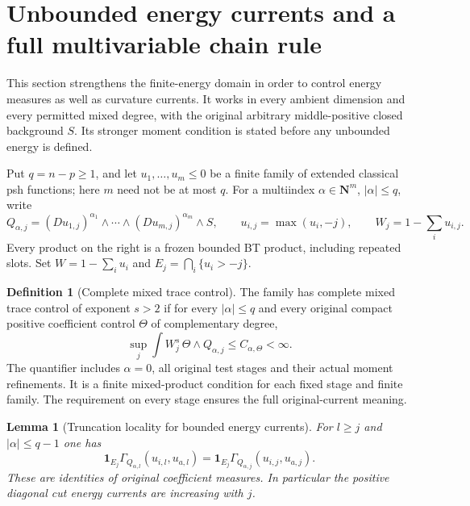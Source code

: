 \documentclass[11pt,a4paper]{article}
\numberwithin{equation}{section}
\newtheorem{lemma}[theorem]{Lemma}
\theoremstyle{definition}
\newtheorem{definition}[theorem]{Definition}
\theoremstyle{remark}
\begin{document}
\section{Unbounded energy currents and a full multivariable chain rule}
\label{sec:r11-unbounded-energy-chain}

This section strengthens the finite-energy domain in order to control
energy measures as well as curvature currents.  It works in every
ambient dimension and every permitted mixed degree, with the original
arbitrary middle-positive closed background $S$.  Its stronger moment
condition is stated before any unbounded energy is defined.

Put $q=n-p\geq1$, and let $u_1,\ldots,u_m\leq0$ be a finite family
of extended classical psh functions; here $m$ need not be at most $q$.
For a multiindex $\alpha\in\mathbf N^m$, $|\alpha|\leq q$, write
\[
 Q_{\alpha,j}=
       (Du_{1,j})^{\alpha_1}\wedge\cdots\wedge
       (Du_{m,j})^{\alpha_m}\wedge S,
 \qquad u_{i,j}=\max(u_i,-j),\qquad
 W_j=1-\sum_i u_{i,j}.
 \tag{UE1}
\]
Every product on the right is a frozen bounded BT product, including
repeated slots.  Set $W=1-\sum_i u_i$ and
$E_j=\bigcap_i\{u_i>-j\}$.

\begin{definition}[Complete mixed trace control]
\label{def:r11-complete-mixed-trace}
The family has complete mixed trace control of exponent $s>2$ if for
every $|\alpha|\leq q$ and every original compact positive coefficient
control $\Theta$ of complementary degree,
\[
                 \sup_j\int W_j^s\,\Theta\wedge Q_{\alpha,j}
                              \leq C_{\alpha,\Theta}<\infty.
 \tag{UE2}
\]
The quantifier includes $\alpha=0$, all original test stages and
their actual moment refinements.  It is a finite mixed-product
condition for each fixed stage and finite family.  The requirement
on every stage ensures the full original-current meaning.
\end{definition}

\begin{lemma}[Truncation locality for bounded energy currents]
\label{lem:r11-energy-truncation-locality}
For $l\geq j$ and $|\alpha|\leq q-1$ one has
\[
 \mathbf1_{E_j}\Gamma_{Q_{\alpha,l}}(u_{i,l},u_{a,l})
       =\mathbf1_{E_j}\Gamma_{Q_{\alpha,j}}(u_{i,j},u_{a,j}).
 \tag{UE3}
\]
These are identities of original coefficient measures.  In particular
the positive diagonal cut energy currents are increasing with $j$.
\end{lemma}
\end{document}
